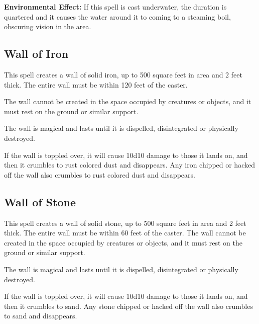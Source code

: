 \begin{multicols*}{2}
\textbf{Environmental Effect:} If this spell is cast underwater, the duration is quartered and it causes the water around it to coming to a steaming boil, obscuring vision in the area.

\subsection{Wall of Iron}\label{spell:Wall of Iron}

This spell creates a wall of solid iron, up to 500 square feet in area and 2 feet thick. The entire wall must be within 120 feet of the caster.

The wall cannot be created in the space occupied by creatures or objects, and it must rest on the ground or similar support.

The wall is magical and lasts until it is dispelled, disintegrated or physically destroyed.

If the wall is toppled over, it will cause 10d10 damage to those it lands on, and then it crumbles to rust colored dust and disappears. Any iron chipped or hacked off the wall also crumbles to rust colored dust and disappears.

\subsection{Wall of Stone}\label{spell:Wall of Stone}

This spell creates a wall of solid stone, up to 500 square feet in area and 2 feet thick. The entire wall must be within 60 feet of the caster. The wall cannot be created in the space occupied by creatures or objects, and it must rest on the ground or similar support.

The wall is magical and lasts until it is dispelled, disintegrated or physically destroyed.

If the wall is toppled over, it will cause 10d10 damage to those it lands on, and then it crumbles to sand. Any stone chipped or hacked off the wall also crumbles to sand and disappears.


\end{multicols*}
